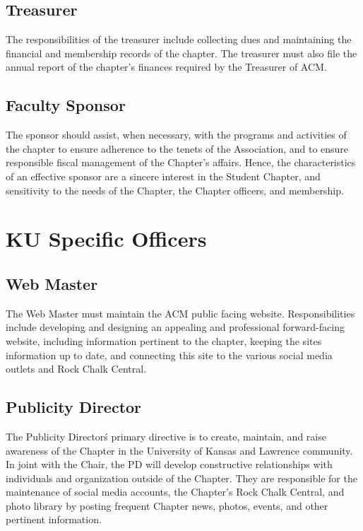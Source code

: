 \subsection*{Treasurer}
The responsibilities of the treasurer include collecting dues and maintaining
the financial and membership records of the chapter. The treasurer must also
file the annual report of the chapter's finances required by the Treasurer of
ACM.

\subsection*{Faculty Sponsor}
The sponsor should assist, when necessary, with the programs and activities of
the chapter to ensure adherence to the tenets of the Association, and to ensure
responsible fiscal management of the Chapter's affairs. Hence, the characteristics
of an effective sponsor are a sincere interest in the Student Chapter, and
sensitivity to the needs of the Chapter, the Chapter officers, and membership.

\section*{KU Specific Officers}

\subsection*{Web Master}
The Web Master must maintain the ACM public facing website. Responsibilities
include developing and designing an appealing and professional forward-facing
website, including information pertinent to the chapter, keeping the site\’s
information up to date, and connecting this site to the various social media
outlets and Rock Chalk Central.

\subsection*{Publicity Director}
The Publicity Director\'s primary directive is to create, maintain, and raise
awareness of the Chapter in the University of Kansas and Lawrence community. In
joint with the Chair, the PD will develop constructive relationships with
individuals and organization outside of the Chapter. They are responsible for
the maintenance of social media accounts, the Chapter's Rock Chalk Central, and
photo library by posting frequent Chapter news, photos, events, and other
pertinent information.


